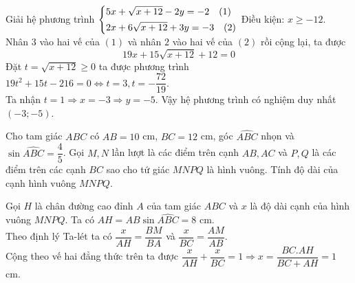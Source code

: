 \begin{ex}%
    Giải hệ phương trình $\left\{\begin{aligned}&5x+\sqrt{x+12}-2y=-2\quad (1)\\&2x+6\sqrt{x+12}+3y=-3\quad (2)\end{aligned}\right.$
   \loigiai
    {Điều kiện: $x\geq -12$.\\Nhân $3$ vào hai vế của $(1)$ và nhân $2$ vào hai vế của $(2)$ rồi cộng lại, ta được $$ 19x+15\sqrt{x+12}+12=0 $$
 Đặt $t=\sqrt{x+12}\geq 0$ ta được phương trình $19t^2+15t-216=0\Leftrightarrow t=3, t=-\dfrac{72}{19}$.\\
Ta nhận $t=1\Rightarrow x=-3\Rightarrow y=-5$. Vậy hệ phương trình có nghiệm duy nhất $(-3;-5)$.   
    }
\end{ex}

\begin{ex}%
Cho tam giác $ABC$ có $AB=10$ cm, $BC=12$ cm, góc $\widehat{ABC}$ nhọn và $\sin\widehat{ABC}=\dfrac{4}{5}$. Gọi $M, N$ lần lượt là các điểm trên cạnh $AB, AC$ và $P, Q$ là các điểm trên các cạnh $BC$ sao cho tứ giác $MNPQ$ là hình vuông. Tính độ dài của cạnh hình vuông $MNPQ$.
\loigiai
    {
\begin{center}
\end{center}
Gọi $H$ là chân đường cao đỉnh $A$ của tam giác $ABC$ và $x$ là độ dài cạnh của hình vuông $MNPQ$. Ta có $AH=AB\sin\widehat{ABC}=8$ cm.\\Theo định lý Ta-lét ta có $\dfrac{x}{AH}=\dfrac{BM}{BA}$ và $\dfrac{x}{BC}=\dfrac{AM}{AB}$.\\Cộng theo vế hai đẳng thức trên ta được $\dfrac{x}{AH}+\dfrac{x}{BC}=1\Rightarrow x=\dfrac{BC.AH}{BC+AH}=1$ cm.
    
    }
\end{ex}

